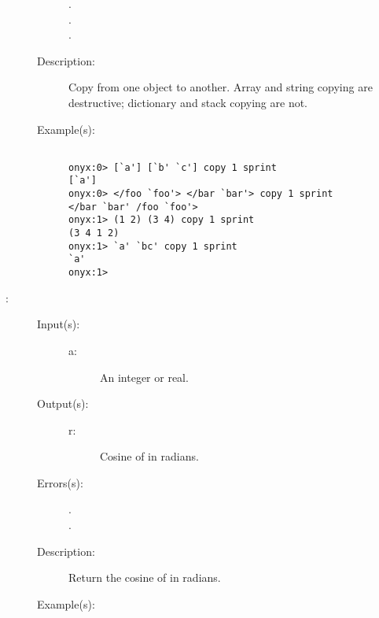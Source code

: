 \begin{description}
\begin{description}
\begin{description}
		\item[.]
		\item[.]
		\item[.]
		\end{description}
	\item[Description: ]
		Copy from one object to another.  Array and string copying are
		destructive; dictionary and stack copying are not.
	\item[Example(s): ]\begin{verbatim}

onyx:0> [`a'] [`b' `c'] copy 1 sprint
[`a']
onyx:0> </foo `foo'> </bar `bar'> copy 1 sprint
</bar `bar' /foo `foo'>
onyx:1> (1 2) (3 4) copy 1 sprint
(3 4 1 2)
onyx:1> `a' `bc' copy 1 sprint
`a'
onyx:1>
		\end{verbatim}
	\end{description}
\label{systemdict:cos}
\item[{\onyxop{a}{cos}{r}}: ]
	\begin{description}\item[]
	\item[Input(s): ]
		\begin{description}\item[]
		\item[a: ]
			An integer or real.
		\end{description}
	\item[Output(s): ]
		\begin{description}\item[]
		\item[r: ]
			Cosine of  in radians.
		\end{description}
	\item[Errors(s): ]
		\begin{description}\item[]
		\item[.]
		\item[.]
		\end{description}
	\item[Description: ]
		Return the cosine of  in radians.
	\item[Example(s): ]\begin{verbatim}


\end{verbatim}
\end{description}
\end{description}
